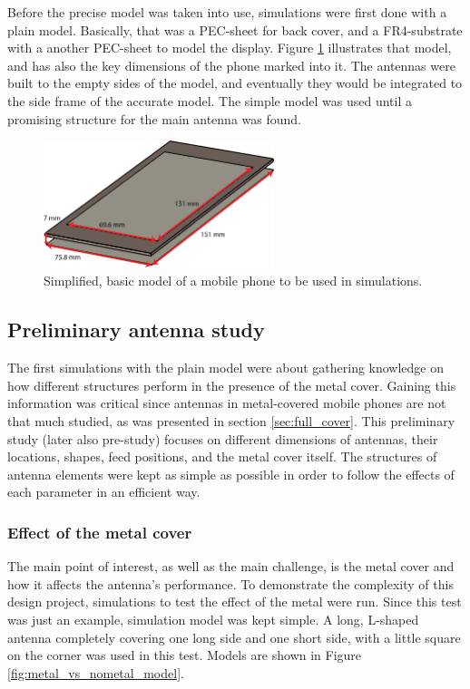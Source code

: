 Before the precise model was taken into use, simulations were first done with a plain model. Basically, that was a PEC-sheet for back cover, and a FR4-substrate with a another PEC-sheet to model the display. Figure \ref{fig:basic_structure} illustrates that model, and has also the key dimensions of the phone marked into it. The antennas were built to the empty sides of the model, and eventually they would be integrated to the side frame of the accurate model. The simple model was used until a promising structure for the main antenna was found. 
\begin{figure}[H]
    \centering
    \includegraphics[width=0.6\textwidth]{img/basic_structure.eps}
    \caption{Simplified, basic model of a mobile phone to be used in simulations.}
    \label{fig:basic_structure}
\end{figure}

\subsection{Preliminary antenna study}
\label{sec:pre_study}
The first simulations with the plain model were about gathering knowledge on how different structures perform in the presence of the metal cover. Gaining this information was critical since antennas in metal-covered mobile phones are not that much studied, as was presented in section \ref{sec:full_cover}. This preliminary study (later also pre-study) focuses on different dimensions of antennas, their locations, shapes, feed positions, and the metal cover itself. The structures of antenna elements were kept as simple as possible in order to follow the effects of each parameter in an efficient way. 


\subsubsection{Effect of the metal cover}
\label{sec:metal_effect}
The main point of interest, as well as the main challenge, is the metal cover and how it affects the antenna's performance. To demonstrate the complexity of this design project, simulations to test the effect of the metal were run. Since this test was just an example, simulation model was kept simple. A long, L-shaped antenna completely covering one long side and one short side, with a little square on the corner was used in this test. Models are shown in Figure \ref{fig:metal_vs_nometal_model}.

